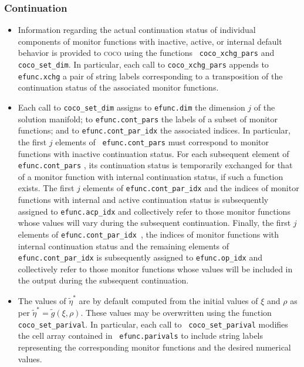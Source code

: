 \documentclass{article}
\begin{document}
\subsubsection{Continuation}

\begin{itemize}
\item Information regarding the actual continuation status of individual
components of monitor functions with inactive, active, or internal default
behavior is provided to \textsc{coco} using the functions \texttt{%
coco\_xchg\_pars} and \texttt{coco\_set\_dim}. In particular, each call to 
\texttt{coco\_xchg\_pars} appends to \texttt{efunc.xchg} a pair of string
labels corresponding to a transposition of the continuation status of the
associated monitor functions.

\item Each call to \texttt{coco\_set\_dim} assigns to \texttt{efunc.dim} the
dimension $j$ of the solution manifold; to \texttt{efunc.cont\_pars} the
labels of a subset of monitor functions; and to \texttt{efunc.cont\_par\_idx}
the associated indices. In particular, the first $j$ elements of \texttt{%
efunc.cont\_pars} must correspond to monitor functions with inactive
continuation status. For each subsequent element of \texttt{efunc.cont\_pars}%
, its continuation status is temporarily exchanged for that of a monitor
function with internal continuation status, if such a function exists. The
first $j$ elements of \texttt{efunc.cont\_par\_idx} and the indices of
monitor functions with internal and active continuation status is
subsequently assigned to \texttt{efunc.acp\_idx} and collectively refer to
those monitor functions whose values will vary during the subsequent
continuation. Finally, the first $j$ elements of \texttt{efunc.cont\_par\_idx%
}, the indices of monitor functions with internal continuation status and
the remaining elements of \texttt{efunc.cont\_par\_idx} is subsequently
assigned to \texttt{efunc.op\_idx} and collectively refer to those monitor
functions whose values will be included in the output during the subsequent
continuation.

\item The values of $\tilde{\eta}^{\ast }$ are by default computed from the
initial values of $\xi $ and $\rho $ as per $\tilde{\eta}^{\ast }=\tilde{g}%
\left( \xi ,\rho \right) $. These values may be overwritten using the
function \texttt{coco\_set\_parival}. In particular, each call to \texttt{%
coco\_set\_parival} modifies the cell array contained in \texttt{%
efunc.parivals} to include string labels representing the corresponding
monitor functions and the desired numerical values.
\end{itemize}
\end{document}
